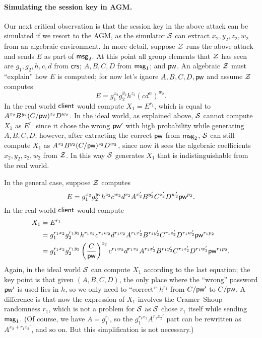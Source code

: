 \paragraph{Simulating the session key in AGM.}

Our next critical observation is that the session key in the above attack can be simulated if we resort to the AGM, as the simulator $\mathcal{S}$ can extract $x_2, y_2, z_2, w_2$ from an algebraic environment. In more detail, suppose $\mathcal{Z}$ runs the above attack and sends $E$ as part of $\mathsf{msg}_{2}$. At this point all group elements that $\mathcal{Z}$ has seen are $g_1,g_2,h,c,d$ from $\mathsf{crs}$; $A,B,C,D$ from $\mathsf{msg}_{1}$; and $\mathsf{pw}$. An algebraic $\mathcal{Z}$ must ``explain'' how $E$ is computed; for now let's ignore $A,B,C,D,\mathsf{pw}$ and assume $\mathcal{Z}$ computes
\[
E = g_1^{x_2}g_2^{y_2}h^{z_2}(cd^\alpha)^{w_2}.
\]
In the real world $\mathsf{client}$ would compute $X_1 = E^{r_1}$, which is equal to $A^{x_2}B^{y_2}(C/\mathsf{pw})^{z_2}D^{w_2}$. In the ideal world, as explained above, $\mathcal{S}$ cannot compute $X_1$ as $E^{r_1}$ since it chose the wrong $\mathsf{pw}'$ with high probability while generating $A,B,C,D$; however, after extracting the correct $\mathsf{pw}$ from $\mathsf{msg}_{2}$, $\mathcal{S}$ can still compute $X_1$ as $A^{x_2}B^{y_2}(C/\mathsf{pw})^{z_2}D^{w_2}$, since now it sees the algebraic coefficients $x_2,y_2,z_2,w_2$ from $\mathcal{Z}$. In this way $\mathcal{S}$ generates $X_1$ that is indistinguishable from the real world.

In the general case, suppose $\mathcal{Z}$ computes
\[
E = g_1^{x_2}g_2^{y_2}h^{z_2}c^{w_2}d^{v_2}A^{x_2'}B^{y_2'}C^{z_2'}D^{w_2'}\mathsf{pw}^{p_2}.
\]
In the real world $\mathsf{client}$ would compute
\begin{align*}
	X_1 &= E^{r_1} \\
	&= g_1^{r_1x_2} g_2^{r_1y_2} h^{r_1z_2} c^{r_1w_2} d^{r_1v_2} A^{r_1x_2'} B^{r_1y_2'} C^{r_1z_2'} D^{r_1w_2'} \mathsf{pw}^{r_1p_2} \\
	&= g_1^{r_1x_2} g_2^{r_1y_2} \left(\frac{C}{\mathsf{pw}}\right)^{z_2} c^{r_1w_2} d^{r_1v_2} A^{r_1x_2'} B^{r_1y_2'} C^{r_1z_2'} D^{r_1w_2'} \mathsf{pw}^{r_1p_2}.
\end{align*}	
Again, in the ideal world $\mathcal{S}$ can compute $X_1$ according to the last equation; the key point is that given $(A,B,C,D)$, the only place where the ``wrong'' password $\mathsf{pw}'$ is used lies in $h$, so we only need to ``correct'' $h^{r_1}$ from $C/\mathsf{pw}'$ to $C/\mathsf{pw}$. A difference is that now the expression of $X_1$ involves the Cramer--Shoup randomness $r_1$, which is not a problem for $\mathcal{S}$ as $\mathcal{S}$ chose $r_1$ itself while sending $\mathsf{msg}_{1}$. (Of course, we have $A = g_1^{r_1}$, so the $g_1^{r_1x_2} A^{r_1x_2'}$ part can be rewritten as $A^{x_2+r_1x_2'}$, and so on. But this simplification is not necessary.)


